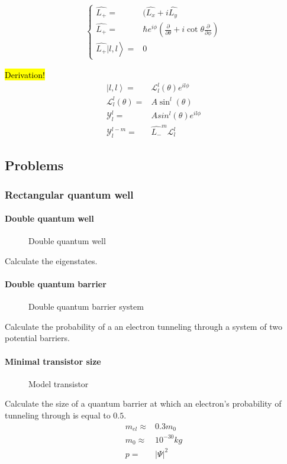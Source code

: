 		\begin{align}
			\left\{ \begin{aligned}
				\hat{L_+} =& (\hat{L_x} +i\hat{L_y}\\
				\hat{L_+} =& \hbar e^{i\phi}\left(\frac{\partial}{\partial \theta} + i\cot{\theta}\frac{\partial}{\partial \phi}\right) \\
				\left. \hat{L_+}|l,l\right\rangle =& 0
			\end{aligned} \right.
		\end{align}
		
		\hl{Derivation!}
		\begin{align}
			\left|l,l\right\rangle =& \mathcal{L}_l^l (\theta) e^{il\phi} \\
			\mathcal{L}_l^l (\theta) =& A\sin^l (\theta) \\
			\mathcal{Y}_l^l =& Asin^l(\theta)e^{il\phi}\\
			\mathcal{Y}_l^{l-m} =& \hat{L_-}^m\mathcal{L}_l^l
		\end{align}
		
	\newpage
	\subsection{Problems}
		\subsubsection{Rectangular quantum well}
			\paragraph{Double quantum well}
				\begin{figure}[!h]
					\centering
					
					\caption{Double quantum well}
				\end{figure}
				
				Calculate the eigenstates.
			\paragraph{Double quantum barrier}
				\begin{figure}[!h]
					\centering
					
					\caption{Double quantum barrier system}
				\end{figure}
				
				Calculate the probability of a an electron tunneling through a system of two potential barriers.			
			\paragraph{Minimal transistor size}
				\begin{figure}[!h]
					\centering
					
					\caption{Model transistor}
				\end{figure}
							
				Calculate the size of a quantum barrier at which an electron's probability of tunneling through is equal to $0.5$.
				\begin{align}
					m_{el} \approx& 0.3 m_0 \\
					m_0 \approx& 10^{-30}\si{kg} \\
					p =& |\Psi|^2
				\end{align}
			